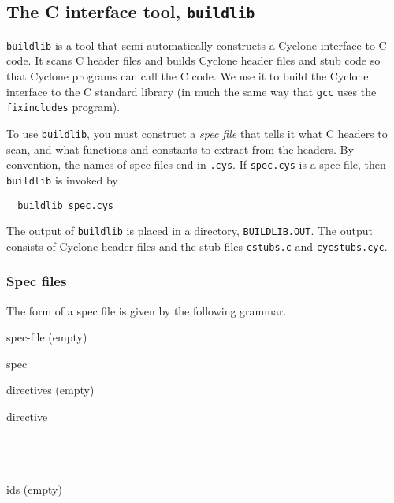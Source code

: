 \subsection{The C interface tool, \texttt{buildlib}}

\texttt{buildlib} is a tool that semi-automatically constructs a
Cyclone interface to C code.  It scans C header files and builds
Cyclone header files and stub code so that Cyclone programs can call
the C code.  We use it to build the Cyclone interface to the C
standard library (in much the same way that \texttt{gcc} uses the
\texttt{fixincludes} program).

To use \texttt{buildlib}, you must construct a \emph{spec file} that
tells it what C headers to scan, and what functions and constants to
extract from the headers.  By convention, the names of spec files end
in \texttt{.cys}.  If \texttt{spec.cys} is a spec file, then
\texttt{buildlib} is invoked by
\begin{verbatim}
  buildlib spec.cys
\end{verbatim}
The output of \texttt{buildlib} is placed in a directory,
\texttt{BUILDLIB.OUT}.  The output consists of Cyclone header files
and the stub files \texttt{cstubs.c} and \texttt{cycstubs.cyc}.  

\subsubsection*{Spec files}

The form of a spec file is given by the following grammar.

\begin{rules}{spec-file}
  (empty)\\
   
\end{rules}
\begin{rules}{spec}
   \tk{:}  \tk{;}
\end{rules}
\begin{rules}{directives}
  (empty)\\
   
\end{rules}
\begin{rules}{directive}
 \tk{\lb}  \tk{\rb} \\
 \tk{\lb}  \tk{\rb} \\
 \opt \tk{\lb}  \tk{\rb} \\
 \opt \tk{\lb}  \tk{\rb} \\
 \opt \tk{\lb}  \tk{\rb}
\end{rules}
\begin{rules}{ids}
  (empty)\\
   
\end{rules}

